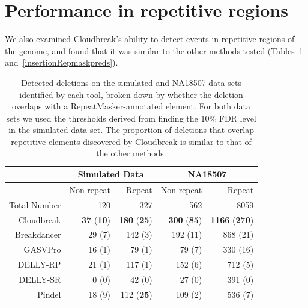 \section{Performance in repetitive regions}

We also examined Cloudbreak's ability to detect events in repetitive regions of the genome, and found that it was similar to the other methods tested (Tables~\ref{deletionRepmaskpreds} and~\ref{insertionRepmaskpreds}).

\begin{table}
\begin{center}
\begin{tabular}{rrr|rr}
 & \multicolumn{2}{c}{Simulated Data} & \multicolumn{2}{c}{NA18507} \\
\hline
 &  Non-repeat & Repeat  &  Non-repeat & Repeat \\ 
 Total Number & 120 & 327 & 562 & 8059 \\ 
  \hline
  Cloudbreak  & \textbf{37} (\textbf{10}) & \textbf{180} (\textbf{25}) & \textbf{300} (\textbf{85}) & \textbf{1166} (\textbf{270}) \\ 
  Breakdancer & 29 (7) & 142 (3) & 192 (11) & 868 (21) \\
  GASVPro     & 16 (1) & 79 (1) & 79 (7) & 330 (16) \\
  DELLY-RP       & 21 (1) & 117 (1) & 152 (6) & 712 (5) \\
  DELLY-SR       & 0 (0) & 42 (0) & 27 (0) & 391 (0) \\
  Pindel      & 18 (9) & 112 (\textbf{25}) & 109 (2) & 536 (7) \\ 
   \hline
\end{tabular}
\end{center}
\caption{Detected deletions on the simulated and NA18507 data sets identified by each tool, broken down by whether the deletion overlaps with a RepeatMasker-annotated element. For both data sets we used the thresholds derived from finding the 10\% FDR level in the simulated data set. The proportion of deletions that overlap repetitive elements discovered by Cloudbreak is similar to that of the other methods.}
\label{deletionRepmaskpreds}
\end{table}


